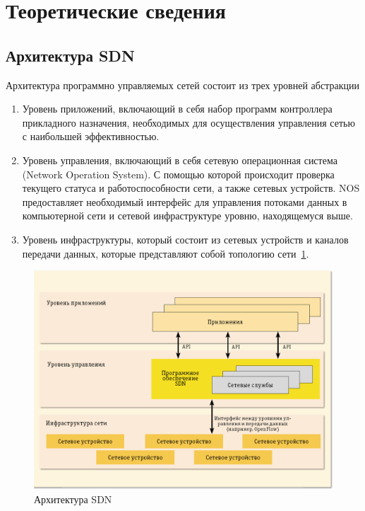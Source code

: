 \documentclass[bachelor, och, coursework]{SCWorks}
\begin{document}
\section{Теоретические сведения}\label{theory}
\subsection{Архитектура SDN}\label{sdn}
Архитектура программно управляемых сетей состоит из трех уровней абстракции
\begin{enumerate}
\item Уровень приложений, включающий в себя набор программ контроллера прикладного назначения, необходимых для осуществления управления сетью с наибольшей эффективностью.
\item Уровень управления, включающий в себя сетевую операционная система (Network Operation System). С помощью которой происходит проверка текущего статуса и работоспособности сети, а также сетевых устройств. NOS предоставляет необходимый интерфейс для управления потоками данных в компьютерной сети и сетевой инфраструктуре уровню, находящемуся выше\cite{habr}.
\item Уровень инфраструктуры, который состоит из сетевых устройств и каналов передачи данных, которые представляют собой топологию сети~\ref{fig:pic-sdn}.
\end{enumerate}
\begin{figure}[H]
    \centering
    \includegraphics[width=\textwidth]{pic-sdn}
    \caption{Архитектура SDN}\label{fig:pic-sdn}
\end{figure}
\end{document}
